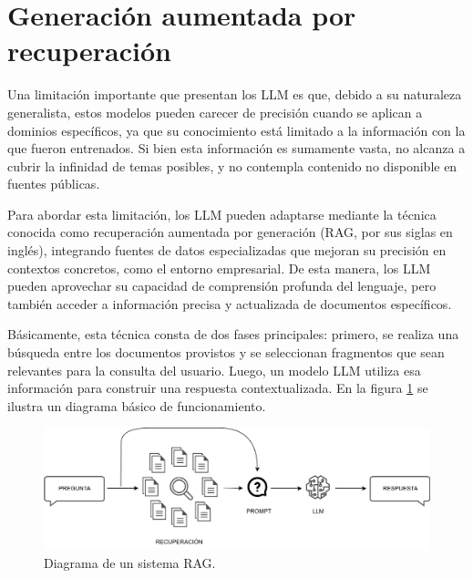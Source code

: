 \vspace{10mm}

\section{Generación aumentada por recuperación}

Una limitación importante que presentan los LLM es que, debido a su naturaleza generalista, estos modelos pueden 
carecer de precisión cuando se aplican a dominios específicos, ya que su conocimiento está limitado a la información 
con la que fueron entrenados. Si bien esta información es sumamente vasta, no alcanza a cubrir la infinidad de temas 
posibles, y no contempla contenido no disponible en fuentes públicas.

Para abordar esta limitación, los LLM pueden adaptarse mediante la técnica conocida como recuperación aumentada por 
generación (RAG, por sus siglas en inglés), integrando fuentes de datos especializadas que mejoran su precisión 
en contextos concretos, como el entorno empresarial. De esta manera, los LLM pueden aprovechar su capacidad de 
comprensión profunda del lenguaje, pero también acceder a información precisa y actualizada de documentos específicos.

Básicamente, esta técnica consta de dos fases principales: primero, se realiza una búsqueda entre los documentos
provistos y se seleccionan fragmentos que sean relevantes para la consulta del usuario. Luego, un modelo LLM
utiliza esa información para construir una respuesta contextualizada. En la figura \ref{fig:rag} se ilustra
un diagrama básico de funcionamiento.

\vspace{3mm}

\begin{figure}[ht]
	\centering
	\includegraphics[scale=.24]{./Figures/rag.png}
	\caption{Diagrama de un sistema RAG.}
	\label{fig:rag}
\end{figure}

